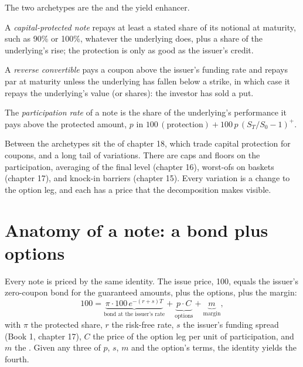 The two archetypes are the  and the yield enhancer.

\begin{definition}\label{def:dv:the-structured-products-business:protected}
A \emph{capital-protected note} repays at least a stated share of its notional at maturity,
such as 90\% or 100\%, whatever the underlying does, plus a share of the underlying's rise; the protection is only as good as
the issuer's credit.
\end{definition}

\begin{definition}\label{def:dv:the-structured-products-business:rc}
A \emph{reverse convertible} pays a coupon above the issuer's funding rate and repays par at
maturity unless the underlying has fallen below a strike, in which case it repays the underlying's value (or shares): the
investor has sold a put.
\end{definition}

\begin{definition}\label{def:dv:the-structured-products-business:participation}
The \emph{participation rate} of a note is the share of the underlying's performance it pays above
the protected amount, $p$ in $100\,(\text{protection})+100\,p\,(S_T/S_0-1)^+$.
\end{definition}

Between the archetypes sit the  of chapter 18, which trade capital protection for coupons, and a long tail of
variations. There are caps and floors on the participation, averaging of the final level (chapter 16), worst-ofs on baskets
(chapter 17), and knock-in barriers (chapter 15). Every variation is a change to the option leg, and each has a price that
the decomposition makes visible.

\section{Anatomy of a note: a bond plus options}

Every note is priced by the same identity. The issue price, 100, equals the issuer's zero-coupon bond for the guaranteed
amounts, plus the options, plus the margin:
\[
100=\underbrace{\pi\cdot100\,e^{-(r+s)T}}_{\text{bond at the issuer's rate}}+\underbrace{p\cdot C}_{\text{options}}+
\underbrace{m}_{\text{margin}},
\]
with $\pi$ the protected share, $r$ the risk-free rate, $s$ the issuer's funding spread (Book 1, chapter 17), $C$ the price of
the option leg per unit of participation, and $m$ the . Given any three of $p$, $s$, $m$ and the option's
terms, the identity yields the fourth.

